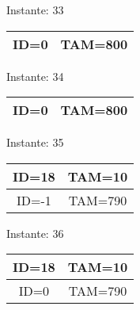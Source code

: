 \documentclass[10pt,a4paper]{article}
\begin{document}
\begin{center}

Instante: 33

\begin{tabular}{|c|c|}
\hline
ID=0 & TAM=800 \\ \hline
\end{tabular}
\end{center}\pagebreak
\begin{center}

Instante: 34

\begin{tabular}{|c|c|}
\hline
ID=0 & TAM=800 \\ \hline
\end{tabular}
\end{center}\pagebreak
\begin{center}

Instante: 35

\begin{tabular}{|c|c|}
\hline
ID=18 & TAM=10 \\ \hline
ID=-1 & TAM=790 \\ \hline
\end{tabular}
\end{center}\pagebreak
\begin{center}

Instante: 36

\begin{tabular}{|c|c|}
\hline
ID=18 & TAM=10 \\ \hline
ID=0 & TAM=790 \\ \hline
\end{tabular}
\end{center}\pagebreak
\end{document}
